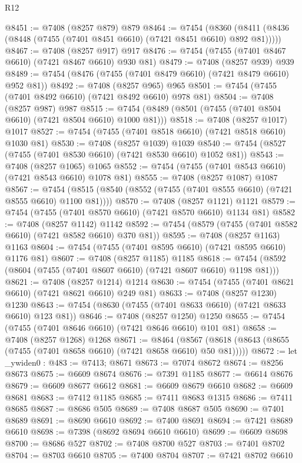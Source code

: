\begin{lexlean}{R12}
\begin{coremodule}
{{{{{{{{{{{{{{{{{{{{{{{{{{{{{{{{{{{{{{{{{{{{{{{{{{{{{{{{{{{{{{{{{{{{{{{{{{{{{{{{{{@8451 := @7408 (@8257 @879) @879
@8464 := @7454
    (@8360 (@8411 (@8436 (@8448 (@7455 (@7401 @8451 @6610) (@7421 @8451 @6610) @892 @81)))))
@8467 := @7408 (@8257 @917) @917
@8476 := @7454 (@7455 (@7401 @8467 @6610) (@7421 @8467 @6610) @930 @81)
@8479 := @7408 (@8257 @939) @939
@8489 := @7454 (@8476 (@7455 (@7401 @8479 @6610) (@7421 @8479 @6610) @952 @81))
@8492 := @7408 (@8257 @965) @965
@8501 := @7454 (@7455 (@7401 @8492 @6610) (@7421 @8492 @6610) @978 @81)
@8504 := @7408 (@8257 @987) @987
@8515 := @7454 (@8489 (@8501 (@7455 (@7401 @8504 @6610) (@7421 @8504 @6610) @1000 @81)))
@8518 := @7408 (@8257 @1017) @1017
@8527 := @7454 (@7455 (@7401 @8518 @6610) (@7421 @8518 @6610) @1030 @81)
@8530 := @7408 (@8257 @1039) @1039
@8540 := @7454 (@8527 (@7455 (@7401 @8530 @6610) (@7421 @8530 @6610) @1052 @81))
@8543 := @7408 (@8257 @1065) @1065
@8552 := @7454 (@7455 (@7401 @8543 @6610) (@7421 @8543 @6610) @1078 @81)
@8555 := @7408 (@8257 @1087) @1087
@8567 := @7454 (@8515 (@8540 (@8552 (@7455 (@7401 @8555 @6610) (@7421 @8555 @6610) @1100 @81))))
@8570 := @7408 (@8257 @1121) @1121
@8579 := @7454 (@7455 (@7401 @8570 @6610) (@7421 @8570 @6610) @1134 @81)
@8582 := @7408 (@8257 @1142) @1142
@8592 := @7454 (@8579 (@7455 (@7401 @8582 @6610) (@7421 @8582 @6610) @370 @81))
@8595 := @7408 (@8257 @1163) @1163
@8604 := @7454 (@7455 (@7401 @8595 @6610) (@7421 @8595 @6610) @1176 @81)
@8607 := @7408 (@8257 @1185) @1185
@8618 := @7454 (@8592 (@8604 (@7455 (@7401 @8607 @6610) (@7421 @8607 @6610) @1198 @81)))
@8621 := @7408 (@8257 @1214) @1214
@8630 := @7454 (@7455 (@7401 @8621 @6610) (@7421 @8621 @6610) @249 @81)
@8633 := @7408 (@8257 @1230) @1230
@8643 := @7454 (@8630 (@7455 (@7401 @8633 @6610) (@7421 @8633 @6610) @123 @81))
@8646 := @7408 (@8257 @1250) @1250
@8655 := @7454 (@7455 (@7401 @8646 @6610) (@7421 @8646 @6610) @101 @81)
@8658 := @7408 (@8257 @1268) @1268
@8671 := @8464
    (@8567 (@8618 (@8643 (@8655 (@7455 (@7401 @8658 @6610) (@7421 @8658 @6610) @50 @81)))))
@8672 := let _ywiden0 : @483 := @7413; @8671
@8673 := @7074 @8672
@8674 := @8256 @8673
@8675 := @6609 @8674
@8676 := @7391 @1185
@8677 := @6614 @8676
@8679 := @6609 @8677 @6612
@8681 := @6609 @8679 @6610
@8682 := @6609 @8681
@8683 := @7412 @1185
@8685 := @7411 @8683 @1315
@8686 := @7411 @8685
@8687 := @8686 @505
@8689 := @7408 @8687 @505
@8690 := @7401 @8689
@8691 := @8690 @6610
@8692 := @7400 @8691
@8694 := @7421 @8689 @6610
@8698 := @7398 (@8692 @8694 @6610 @6610)
@8699 := @6609 @8698
@8700 := @8686 @527
@8702 := @7408 @8700 @527
@8703 := @7401 @8702
@8704 := @8703 @6610
@8705 := @7400 @8704
@8707 := @7421 @8702 @6610
}}}}}}}}}}}}}}}}}}}}}}}}}}}}}}}}}}}}}}}}}}}}}}}}}}}}}}}}}}}}}}}}}}}}}}}}}}}}}}}}}}
\end{coremodule}
\end{lexlean}

